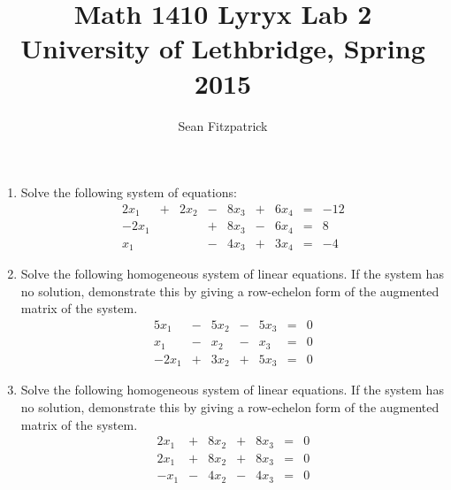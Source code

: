 \documentclass[letterpaper,12pt]{article}
\title{Math 1410 Lyryx Lab 2\\University of Lethbridge, Spring 2015}
\author{Sean Fitzpatrick}
\begin{document}
 \maketitle


\begin{enumerate}
 \item Solve the following system of equations:
\[
 \begin{array}{ccccccccc}
  2x_1&+&2x_2&-&8x_3&+&6x_4&=&-12\\
  -2x_1& & &+&8x_3&-&6x_4&=&8\\
x_1& & &-&4x_3&+&3x_4&=&-4
 \end{array}
\]
 \item Solve the following homogeneous system of linear equations. If the system has no solution, demonstrate this by giving a row-echelon form of the augmented matrix of the system.
\[
 \begin{array}{ccccccc}
  5x_1&-&5x_2&-&5x_3&=&0\\
x_1&-&x_2&-&x_3&=&0\\
-2x_1&+&3x_2&+&5x_3&=&0
 \end{array}
\]
\item Solve the following homogeneous system of linear equations. If the system has no solution, demonstrate this by giving a row-echelon form of the augmented matrix of the system.
\[
  \begin{array}{ccccccc}
 2x_1&+&8x_2&+&8x_3&=&0\\
2x_1&+&8x_2&+&8x_3&=&0\\
-x_1&-&4x_2&-&4x_3&=&0
 \end{array}
\]


\end{enumerate}
\end{document}
